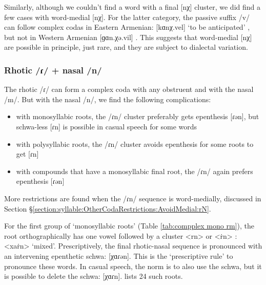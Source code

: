 	Similarly, although we couldn't find a word with a final [nχ] cluster, we did find a few cases with word-medial [nχ]. For the latter category, the passive suffix /v/ can follow complex codas in Eastern Armenian:  [kɑnχ.vel] `to be anticipated' , but not in Western Armenian [ɡɑn.χə.vil] . This suggests that word-medial [nχ] are possible in principle, just rare, and they are subject to dialectal variation. 
	
	
	
	
	\subsubsection{Rhotic /ɾ/ + nasal /n/}\label{section:syllable:Final2C:FallingOther:RhoticNasalN}
	The rhotic /ɾ/ can form a complex coda with any obstruent and with the nasal /m/. But with the nasal /n/, we find the following complications: 
	\begin{itemize}[noitemsep, topsep=0pt]
		\item with monosyllabic roots, the /ɾn/ cluster preferably gets epenthesis [ɾən], but schwa-less [ɾn] is possible in casual  speech for some words
		\item with polysyllabic roots, the /ɾn/ cluster avoids epenthesis for some roots to get [ɾn]
		\item with compounds that have a monosyllabic final root, the /ɾn/ again prefers epenthesis [ɾən]
	\end{itemize}
	
	More restrictions are found when the /ɾn/ sequence is word-medially, discussed in Section \S\ref{section:syllable:OtherCodaRestrictions:AvoidMedial:rN}. 
	
	For the first group of `monosyllabic roots' (Table \ref{tab:compplex mono rm}), the root orthographically has one vowel followed by a cluster  <rn>   or <\.rn> : <xa\.rn> `mixed'. Prescriptively, the final rhotic-nasal sequence is pronounced with an intervening epenthetic schwa: [χɑɾən]. This is the `prescriptive rule' to pronounce these words. In casual speech, the norm is to also use the schwa, but it is possible to delete the schwa: [χɑɾn]. \citeauthor{kouyoumdjian-1970-DictionaryArmenianEnglish}  lists 24 such roots. 
	
